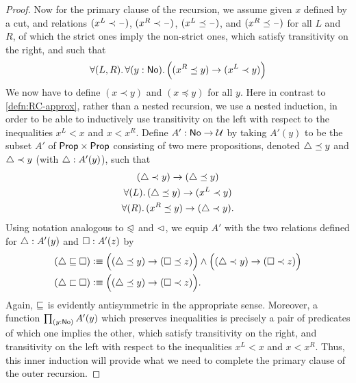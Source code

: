 \begin{proof}
  Now for the primary clause of the recursion, we assume given $x$ defined by a cut, and relations $(x^L \prec \mathord{\hspace{1pt}\text{--}\hspace{1pt}})$, $(x^R \prec \mathord{\hspace{1pt}\text{--}\hspace{1pt}})$, $(x^L \preceq \mathord{\hspace{1pt}\text{--}\hspace{1pt}})$, and $(x^R \preceq \mathord{\hspace{1pt}\text{--}\hspace{1pt}})$ for all $L$ and $R$, of which the strict ones imply the non-strict ones, which satisfy transitivity on the right, and such that
  \begin{equation}\label{eq:NO-prec-outer-IH}
    \fall{L,R}{y:\NO}\Big( (x^R\preceq y) \to (x^L \prec y) \Big)
  \end{equation}
  We now have to define $(x\prec y)$ and $(x\preceq y)$ for all $y$.
  Here in contrast to \autoref{defn:RC-approx}, rather than a nested recursion, we use a nested induction, in order to be able to inductively use transitivity on the left with respect to the inequalities $x^L<x$ and $x<x^R$.
  Define $A':\mathsf{No}\to\mathcal{U}$ by taking $A'(y)$ to be the subset $A'$ of $\mathsf{Prop}\times\mathsf{Prop}$ consisting of two mere propositions, denoted $\triangle\preceq y$ and $\triangle\prec y$ (with $\triangle:A'(y)$), such that
  \begin{gather}
    (\tlt y) \to (\tle y)\\
    \fall{L} (\tle y)\to (x^L\prec y) \label{eq:NO-prec-IHL}\\
    \fall{R} (x^R \preceq y) \to (\tlt y) \label{eq:NO-prec-IHR}.
  \end{gather}
  Using notation analogous to $\trianglelefteqslant$ and $\vartriangleleft$, we equip $A'$ with the two relations defined for $\triangle:A'(y)$ and $\square:A'(z)$ by
  \begin{align*}
    (\tlname \bble \tlbname) &\defeq
    \Big((\tle y) \to (\tleb z)\Big) \land \Big((\tlt y) \to (\tltb z)\Big)\\
    (\tlname \bblt \tlbname) &\defeq
    \Big((\tle y) \to (\tltb z)\Big). %
  \end{align*}
  Again, $\sqsubseteq$ is evidently antisymmetric in the appropriate sense.
  Moreover, a function $\prd{y:\NO} A'(y)$ which preserves inequalities is precisely a pair of predicates of which one implies the other, which satisfy transitivity on the right, and transitivity on the left with respect to the inequalities $x^L<x$ and $x<x^R$.
  Thus, this inner induction will provide what we need to complete the primary clause of the outer recursion.


\end{proof}
